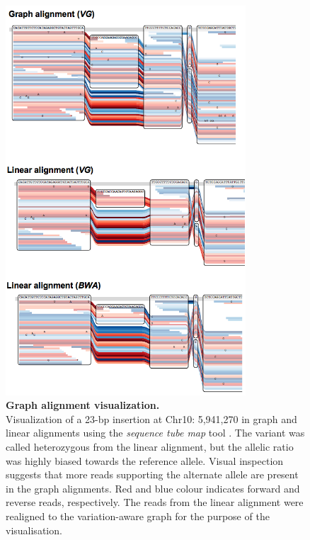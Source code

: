 \documentclass[../main.tex]{subfiles}
\begin{document}
\begin{flushleft}
\begin{figure}[!htb]
    \centering
    \includegraphics[width=0.8\textwidth]{paper2/supplement/sp314.png}
    \caption[Graph alignment visualization.]{\textbf{Graph alignment visualization.} \\
    \small{Visualization of a 23-bp insertion at
    Chr10: 5,941,270 in graph and linear alignments using the \emph{sequence tube map} tool \citep{beyer2019sequence}. The variant was called heterozygous from the linear alignment,
    but the allelic ratio was highly biased towards the reference allele. Visual inspection
    suggests that more reads supporting the alternate allele are present in the graph
    alignments. Red and blue colour indicates forward and reverse reads, respectively.
    The reads from the linear alignment were realigned to the variation-aware graph for
    the purpose of the visualisation.}}
    \label{sup_fig:s314}
\end{figure}


\end{flushleft}
\end{document}
